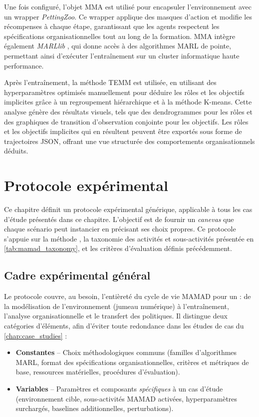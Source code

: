 Une fois configuré, l'objet MMA est utilisé pour encapsuler l'environnement avec un wrapper \textit{PettingZoo}. Ce wrapper applique des masques d'action et modifie les récompenses à chaque étape, garantissant que les agents respectent les spécifications organisationnelles tout au long de la formation. MMA intègre également \textit{MARLlib} \cite{hu2021marlib}, qui donne accès à des algorithmes MARL de pointe, permettant ainsi d'exécuter l'entraînement sur un cluster informatique haute performance.

Après l'entraînement, la méthode TEMM est utilisée, en utilisant des hyperparamètres optimisés manuellement pour déduire les rôles et les objectifs implicites grâce à un regroupement hiérarchique et à la méthode K-means. Cette analyse génère des résultats visuels, tels que des dendrogrammes pour les rôles et des graphiques de transition d'observation conjointe pour les objectifs. Les rôles et les objectifs implicites qui en résultent peuvent être exportés sous forme de trajectoires JSON, offrant une vue structurée des comportements organisationnels déduits.




\clearpage
\thispagestyle{empty}
\null
\newpage

\chapter{Protocole expérimental}
\label{chap:experimental_protocol}

Ce chapitre définit un protocole expérimental générique, applicable à tous les cas d'étude présentés dans ce chapitre.
L'objectif est de fournir un \textit{canevas} que chaque scénario peut instancier en précisant ses choix propres.
Ce protocole s'appuie sur la méthode , la taxonomie des activités et sous-activités présentée en \autoref{tab:mamad_taxonomy}, et les critères d'évaluation définis précédemment.

\section{Cadre expérimental général}
\label{sec:generic_experimental_framework}

Le protocole couvre, au besoin, l’entièreté du cycle de vie MAMAD pour un  : de la modélisation de l’environnement (jumeau numérique) à l’entraînement, l’analyse organisationnelle et le transfert des politiques. Il distingue deux catégories d’éléments, afin d’éviter toute redondance dans les études de cas du \autoref{chap:case_studies} :
\begin{itemize}
  \item \textbf{Constantes} -- Choix méthodologiques communs (familles d’algorithmes MARL, format des spécifications organisationnelles, critères et métriques de base, ressources matérielles, procédures d’évaluation).
  \item \textbf{Variables} -- Paramètres et composants \textit{spécifiques} à un cas d’étude (environnement cible, sous-activités MAMAD activées, hyperparamètres surchargés, baselines additionnelles, perturbations).
\end{itemize}

